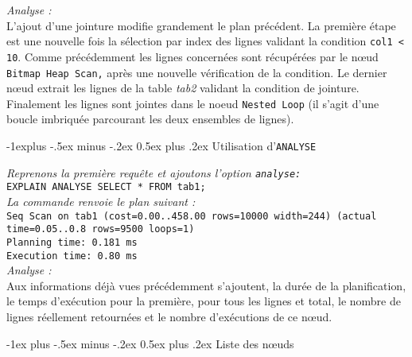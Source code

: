 \documentclass[10pt,landscape, a4paper]{article}
\makeatletter
\renewcommand{\section}{\@startsection{section}{1}{0mm}%
                                {-1ex plus -.5ex minus -.2ex}%
                                {0.5ex plus .2ex}%
                                {\normalfont\large\bfseries}}
\renewcommand{\subsection}{\@startsection{subsection}{2}{0mm}%
                                {-1explus -.5ex minus -.2ex}%
                                {0.5ex plus .2ex}%
                                {\normalfont\normalsize\bfseries}}
\makeatother
\begin{document}
\begin{multicols}{3}
\hspace{0.25em} {\scriptsize \emph{Analyse :}}\\
{\scriptsize L'ajout d'une jointure modifie grandement le plan précédent. La première étape est une nouvelle fois \textcolor{node}{la sélection par index des lignes}  \textcolor{filter}{validant la condition \texttt{col1 < 10}.} Comme précédemment les lignes concernées sont  \textcolor{node2}{récupérées par le nœud \texttt{Bitmap Heap Scan,}} après  \textcolor{filter2}{une nouvelle vérification de la condition.}  \textcolor{node3}{Le dernier nœud} extrait les lignes de la  \textcolor{table}{table \emph{tab2}} validant \textcolor{filter3}{la condition de jointure.} Finalement les lignes sont jointes dans le \textcolor{node4}{noeud \texttt{Nested Loop}} (il s'agit d'une boucle imbriquée parcourant les deux ensembles de lignes).}

\subsection{Utilisation d'\texttt{ANALYSE}}

\hspace{0.25em} {\scriptsize \emph{Reprenons la première requête et ajoutons l'option \texttt{analyse:}}}\\
\texttt{EXPLAIN ANALYSE SELECT * FROM tab1;}\\
\hspace{0.25em} {\scriptsize \emph{La commande renvoie le plan suivant :}}\\
\texttt{Seq Scan on tab1  (cost=0.00..458.00 rows=10000 width=244) (actual time=\textcolor{filter2}{0.05}..\textcolor{filter3}{0.8} rows=\textcolor{node2}{9500} loops=\textcolor{node3}{1})\\
 \textcolor{node}{Planning time: 0.181 ms}\\
 \textcolor{filter}{Execution time: 0.80 ms}\\}
\hspace{0.25em} {\scriptsize \emph{Analyse :}}\\
{\scriptsize Aux informations déjà vues précédemment s'ajoutent, \textcolor{node}{la durée de la planification,} \textcolor{filter2}{le temps d'exécution pour la première,} \textcolor{filter3}{pour tous les lignes} et \textcolor{filter}{total,} \textcolor{node2}{le nombre de lignes réellement retournées} et \textcolor{node3}{le nombre d'exécutions de ce nœud.}}

\section{Liste des nœuds}


\end{multicols}
\end{document}
